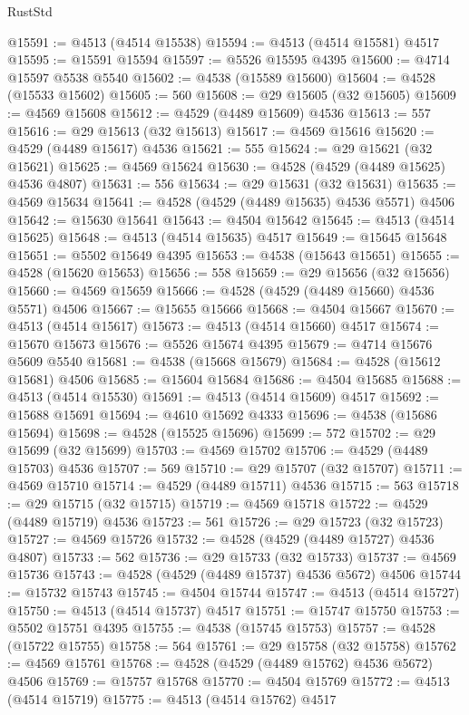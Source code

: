 \begin{lexlean}{RustStd}
\begin{coremodule}
@15591 := @4513 (@4514 @15538)
@15594 := @4513 (@4514 @15581) @4517
@15595 := @15591 @15594
@15597 := @5526 @15595 @4395
@15600 := @4714 @15597 @5538 @5540
@15602 := @4538 (@15589 @15600)
@15604 := @4528 (@15533 @15602)
@15605 := 560
@15608 := @29 @15605 (@32 @15605)
@15609 := @4569 @15608
@15612 := @4529 (@4489 @15609) @4536
@15613 := 557
@15616 := @29 @15613 (@32 @15613)
@15617 := @4569 @15616
@15620 := @4529 (@4489 @15617) @4536
@15621 := 555
@15624 := @29 @15621 (@32 @15621)
@15625 := @4569 @15624
@15630 := @4528 (@4529 (@4489 @15625) @4536 @4807)
@15631 := 556
@15634 := @29 @15631 (@32 @15631)
@15635 := @4569 @15634
@15641 := @4528 (@4529 (@4489 @15635) @4536 @5571) @4506
@15642 := @15630 @15641
@15643 := @4504 @15642
@15645 := @4513 (@4514 @15625)
@15648 := @4513 (@4514 @15635) @4517
@15649 := @15645 @15648
@15651 := @5502 @15649 @4395
@15653 := @4538 (@15643 @15651)
@15655 := @4528 (@15620 @15653)
@15656 := 558
@15659 := @29 @15656 (@32 @15656)
@15660 := @4569 @15659
@15666 := @4528 (@4529 (@4489 @15660) @4536 @5571) @4506
@15667 := @15655 @15666
@15668 := @4504 @15667
@15670 := @4513 (@4514 @15617)
@15673 := @4513 (@4514 @15660) @4517
@15674 := @15670 @15673
@15676 := @5526 @15674 @4395
@15679 := @4714 @15676 @5609 @5540
@15681 := @4538 (@15668 @15679)
@15684 := @4528 (@15612 @15681) @4506
@15685 := @15604 @15684
@15686 := @4504 @15685
@15688 := @4513 (@4514 @15530)
@15691 := @4513 (@4514 @15609) @4517
@15692 := @15688 @15691
@15694 := @4610 @15692 @4333
@15696 := @4538 (@15686 @15694)
@15698 := @4528 (@15525 @15696)
@15699 := 572
@15702 := @29 @15699 (@32 @15699)
@15703 := @4569 @15702
@15706 := @4529 (@4489 @15703) @4536
@15707 := 569
@15710 := @29 @15707 (@32 @15707)
@15711 := @4569 @15710
@15714 := @4529 (@4489 @15711) @4536
@15715 := 563
@15718 := @29 @15715 (@32 @15715)
@15719 := @4569 @15718
@15722 := @4529 (@4489 @15719) @4536
@15723 := 561
@15726 := @29 @15723 (@32 @15723)
@15727 := @4569 @15726
@15732 := @4528 (@4529 (@4489 @15727) @4536 @4807)
@15733 := 562
@15736 := @29 @15733 (@32 @15733)
@15737 := @4569 @15736
@15743 := @4528 (@4529 (@4489 @15737) @4536 @5672) @4506
@15744 := @15732 @15743
@15745 := @4504 @15744
@15747 := @4513 (@4514 @15727)
@15750 := @4513 (@4514 @15737) @4517
@15751 := @15747 @15750
@15753 := @5502 @15751 @4395
@15755 := @4538 (@15745 @15753)
@15757 := @4528 (@15722 @15755)
@15758 := 564
@15761 := @29 @15758 (@32 @15758)
@15762 := @4569 @15761
@15768 := @4528 (@4529 (@4489 @15762) @4536 @5672) @4506
@15769 := @15757 @15768
@15770 := @4504 @15769
@15772 := @4513 (@4514 @15719)
@15775 := @4513 (@4514 @15762) @4517

\end{coremodule}
\end{lexlean}

